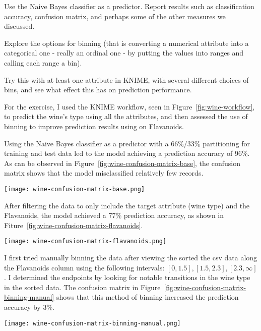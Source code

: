 \documentclass[
  coursecode={CMPE 251},
  assignmentname={Exercise 2},
  studentnumber=20053722,
  name={Bryan Hoang},
]{
  ltxanswer%
}
\begin{document}
  \begin{questions}
    \question[2]{}
    Use the Naive Bayes classifier as a predictor. Report results such as classification accuracy, confusion matrix, and perhaps some of the other measures we discussed.

    Explore the options for binning (that is converting a numerical attribute into a categorical one - really an ordinal one - by putting the values into ranges and calling each range a bin).

    Try this with at least one attribute in KNIME, with several different choices of bins, and see what effect this has on prediction performance.
    \begin{solution}
      For the exercise, I used the KNIME workflow, seen in Figure~\ref{fig:wine-workflow}, to predict the wine's type using all the attributes, and then assessed the use of binning to improve prediction results using on Flavanoids.

      Using the Naive Bayes classifier as a predictor with a 66\%/33\% partitioning for training and test data led to the model achieving a prediction accuracy of \textapprox{}96\%. As can be observed in Figure~\ref{fig:wine-confusion-matrix-base}, the confusion matrix shows that the model misclassified relatively few records.
      \begin{answerfigure}
        \texttt{[image: wine-confusion-matrix-base.png]}
        \label{fig:wine-confusion-matrix-base}
      \end{answerfigure}

      After filtering the data to only include the target attribute (wine type) and the Flavanoids, the model achieved a \textapprox{}77\% prediction accuracy, as shown in Fiture~\ref{fig:wine-confusion-matrix-flavanoids}.
      \begin{answerfigure}
        \texttt{[image: wine-confusion-matrix-flavanoids.png]}
        \label{fig:wine-confusion-matrix-flavanoids}
      \end{answerfigure}

      \newpage

      I first tried manually binning the data after viewing the sorted the csv data along the Flavanoids column using the following intervals: \([0, 1.5], [1.5, 2.3], [2.3, \infty]\). I determined the endpoints  by looking for notable transitions in the wine type in the sorted data. The confusion matrix in Figure~\ref{fig:wine-confusion-matrix-binning-manual} shows that this method of binning increased the prediction accuracy by \textapprox{}3\%.
      \begin{answerfigure}
        \texttt{[image: wine-confusion-matrix-binning-manual.png]}
        \label{fig:wine-confusion-matrix-binning-manual}
      \end{answerfigure}


\end{solution}
\end{questions}
\end{document}

